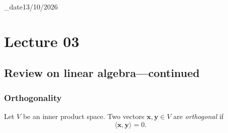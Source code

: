 \lecture_date{13/10/2026}
\chapter{Lecture 03}


\section{Review on linear algebra---continued}

\subsection{Orthogonality}

\begin{definition}[Orthogonality]
	Let \( V \) be an inner product space. Two vectors \( \mathbf{x}, \mathbf{y} \in V \) are \emph{orthogonal} if
	\begin{equation}
		\langle \mathbf{x}, \mathbf{y} \rangle = 0.
		\label{eq:orthogonality-1}
	\end{equation}
\end{definition}




